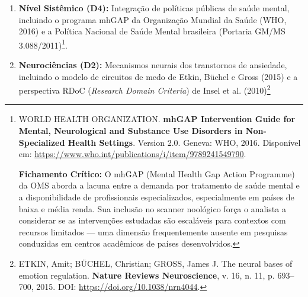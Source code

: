 \begin{enumerate}
{    \textbf{Trecho Original:} ``The key to cooperation is not trust, but the durability of the relationship.''

    \textbf{Tradução:} ``A chave para a cooperação não é a confiança, mas a durabilidade da relação.''

    \textbf{Fichamento Crítico:} Axelrod (1984) demonstrou, através de torneios computacionais do Dilema do Prisioneiro Iterado, que estratégias cooperativas (como Tit-for-Tat) evoluem como estáveis em populações quando as interações são repetidas. Aplicado à clínica: a aliança terapêutica pode ser modelada como um jogo iterado onde ambos os jogadores aprendem, ao longo das sessões, que a cooperação (engajamento no tratamento) produz melhores resultados que a deserção (abandono ou resistência). Esta perspectiva oferece insights para intervenções que aumentam a ``durabilidade percebida da relação'' como preditor de adesão.
  }.

  \item \textbf{Nível Sistêmico (D4):} Integração de políticas públicas de saúde mental, incluindo o programa mhGAP da Organização Mundial da Saúde (WHO, 2016) e a Política Nacional de Saúde Mental brasileira (Portaria GM/MS 3.088/2011)\footnote{
    WORLD HEALTH ORGANIZATION. \textbf{mhGAP Intervention Guide for Mental, Neurological and Substance Use Disorders in Non-Specialized Health Settings}. Version 2.0. Geneva: WHO, 2016. Disponível em: \url{https://www.who.int/publications/i/item/9789241549790}.

    \textbf{Fichamento Crítico:} O mhGAP (Mental Health Gap Action Programme) da OMS aborda a lacuna entre a demanda por tratamento de saúde mental e a disponibilidade de profissionais especializados, especialmente em países de baixa e média renda. Sua inclusão no scanner noológico força o analista a considerar se as intervenções estudadas são escaláveis para contextos com recursos limitados --- uma dimensão frequentemente ausente em pesquisas conduzidas em centros acadêmicos de países desenvolvidos.
  }.

  \item \textbf{Neurociências (D2):} Mecanismos neurais dos transtornos de ansiedade, incluindo o modelo de circuitos de medo de Etkin, Büchel e Gross (2015) e a perspectiva RDoC (\textit{Research Domain Criteria}) de Insel et al. (2010)\footnote{
    ETKIN, Amit; BÜCHEL, Christian; GROSS, James J. The neural bases of emotion regulation. \textbf{Nature Reviews Neuroscience}, v. 16, n. 11, p. 693--700, 2015. DOI: \url{https://doi.org/10.1038/nrn4044}.

}
\end{enumerate}
